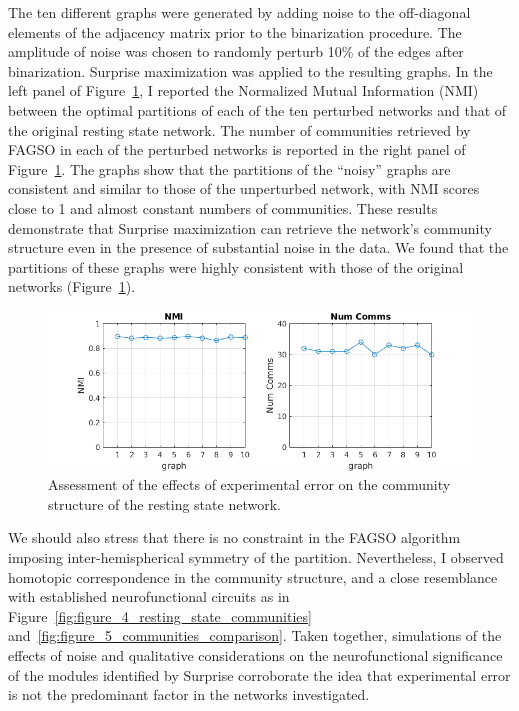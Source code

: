 The ten different graphs were generated by adding noise to the off-diagonal elements of the adjacency matrix prior to the binarization procedure. The amplitude of noise was chosen to randomly perturb 10\% of the edges after binarization. Surprise maximization was applied to the resulting graphs. In the left panel of Figure~\ref{fig:figure_9_nmi}, I reported the Normalized Mutual Information (NMI) between the optimal partitions of each of the ten perturbed networks and that of the original resting state network.
The number of communities retrieved by FAGSO in each of the perturbed networks is reported in the right panel of Figure~\ref{fig:figure_9_nmi}. The graphs show that the partitions of the ``noisy'' graphs are consistent and similar to those of the unperturbed network, with NMI scores close to 1 and almost constant numbers of communities.
These results demonstrate that Surprise maximization can retrieve the network's community structure even in the presence of substantial noise in the data.
We found that the partitions of these graphs were highly consistent with those of the original networks (Figure~\ref{fig:figure_9_nmi}).

\begin{figure}[ht]
\centering
\includegraphics[width=1\linewidth]{images/figure_9_nmi.png}
\caption{Assessment of the effects of experimental error on the community structure of the resting state network.}
\label{fig:figure_9_nmi}
\end{figure}

We should also stress that there is no constraint in the FAGSO algorithm imposing inter-hemispherical symmetry of the partition.
Nevertheless, I observed homotopic correspondence in the community structure, and a close resemblance with established neurofunctional circuits as in Figure~\ref{fig:figure_4_resting_state_communities} and~\ref{fig:figure_5_communities_comparison}. Taken together, simulations of the effects of noise and qualitative considerations on the neurofunctional significance of the modules identified by Surprise corroborate the idea that experimental error is not the predominant factor in the networks investigated.

